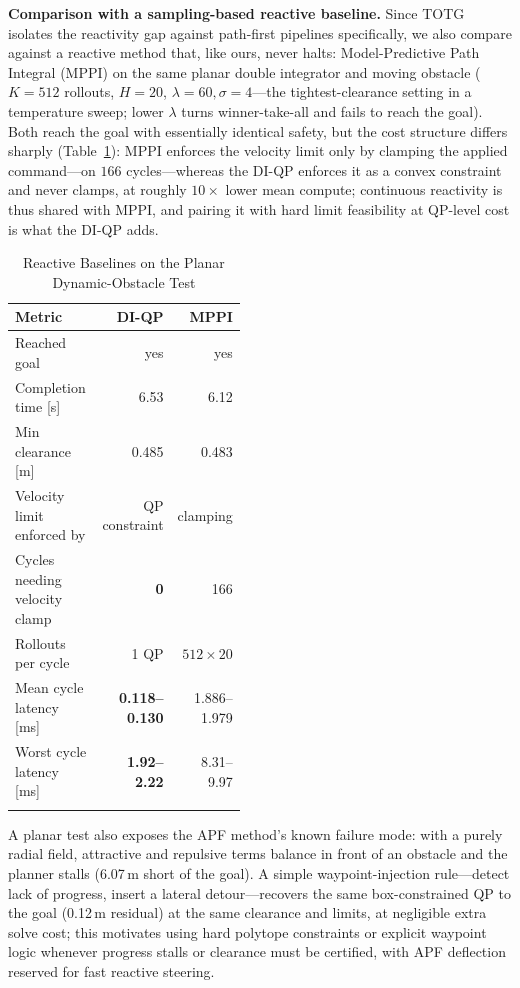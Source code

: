\textbf{Comparison with a sampling-based reactive baseline.} Since TOTG
isolates the reactivity gap against path-first pipelines specifically, we
also compare against a reactive method that, like ours, never halts:
Model-Predictive Path Integral (MPPI) \cite{williams2017} on the same
planar double integrator and moving obstacle (\(K{=}512\) rollouts,
\(H{=}20\), \(\lambda{=}60,\sigma{=}4\)---the tightest-clearance setting
in a temperature sweep; lower \(\lambda\) turns winner-take-all and fails
to reach the goal). Both reach the goal with essentially identical
safety, but the cost structure differs sharply
(Table~\ref{tab:mppi-compare}): MPPI enforces the velocity limit only by
clamping the applied command---on \(166\) cycles---whereas the DI-QP
enforces it as a convex constraint and never clamps, at roughly
\(10\times\) lower mean compute; continuous reactivity is thus shared
with MPPI, and pairing it with hard limit feasibility at
QP-level cost is what the DI-QP adds.

{%
\begin{table}[t]
\caption{Reactive Baselines on the Planar Dynamic-Obstacle Test}
\label{tab:mppi-compare}
\centering
\footnotesize
\setlength{\tabcolsep}{4pt}
\begin{tabular}{@{}>{\raggedright\arraybackslash}p{0.46\linewidth}rr@{}}
\toprule\noalign{}
Metric & DI-QP & MPPI \\
\midrule\noalign{}
Reached goal & yes & yes \\
Completion time {[}s{]} & 6.53 & 6.12 \\
Min clearance {[}m{]} & 0.485 & 0.483 \\
Velocity limit enforced by & QP constraint & clamping \\
Cycles needing velocity clamp & \textbf{0} & 166 \\
Rollouts per cycle & 1 QP & \(512\times20\) \\
Mean cycle latency {[}ms{]} & \textbf{0.118--0.130} & 1.886--1.979 \\
Worst cycle latency {[}ms{]} & \textbf{1.92--2.22} & 8.31--9.97 \\
\bottomrule\noalign{}
\end{tabular}
\end{table}
}

A planar test also exposes the APF method's known failure mode: with a
purely radial field, attractive and repulsive terms balance in front of an
obstacle and the planner stalls (6.07\,m short of the goal). A simple
waypoint-injection rule---detect lack of progress, insert a lateral
detour---recovers the same box-constrained QP to the goal (0.12\,m
residual) at the same clearance and limits, at negligible extra solve
cost; this motivates using hard polytope constraints or explicit waypoint
logic whenever progress stalls or clearance must be certified, with APF
deflection reserved for fast reactive steering.

